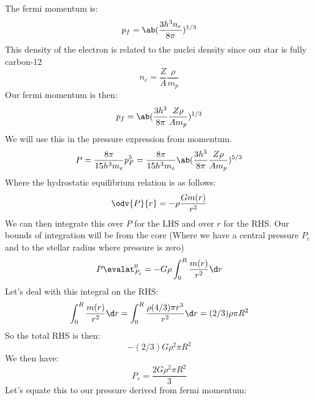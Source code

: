 The fermi momentum is:
\begin{equation}
    p_f = \ab(\frac{3h^3 n_e}{8\pi})^{1/3}
\end{equation}
This density of the electron is related to the nuclei density since our star is fully carbon-12
\begin{equation}
    n_e = \frac{Z}{A} \frac{\rho}{m_p} 
\end{equation}
Our fermi momentum is then:
\begin{equation}
    p_f = \ab(\frac{3h^3}{8\pi}\frac{Z\rho}{Am_p})^{1/3}
\end{equation}
We will use this in the pressure expression from momentum.
\begin{equation}
    P = \frac{8\pi}{15h^3 m_e}p_F^5 = \frac{8\pi}{15h^3m_e}\ab(\frac{3h^3}{8\pi}\frac{Z\rho}{Am_p})^{5/3}
\end{equation}
Where the hydrostatic equilibrium relation is as follows:
\begin{equation}
    \odv{P}{r} = -\rho \frac{Gm(r)}{r^2}
\end{equation}
We can then integrate this over $P$ for the LHS and over $r$ for the RHS. Our bounds of integration will be from the core (Where we have a central pressure $P_c$ and to the stellar radius where pressure is zero)
\begin{equation}
    P\evalat_{P_c}^0 = -G\rho \int_{0}^R \frac{m(r)}{r^2}\d r 
\end{equation}
Let's deal with this integral on the RHS:
\begin{equation}
    \int_0^R \frac{m(r)}{r^2}\d r = \int_0^R \frac{\rho (4/3)\pi r^3}{r^2}\d r = (2/3)\rho \pi R^2
\end{equation}
So the total RHS is then:
\begin{equation}
    -(2/3)G\rho^2 \pi R^2
\end{equation}
We then have:
\begin{equation}
    P_c = \frac{2G\rho^2\pi R^2}{3}
\end{equation}
Let's equate this to our pressure derived from fermi momentum:
